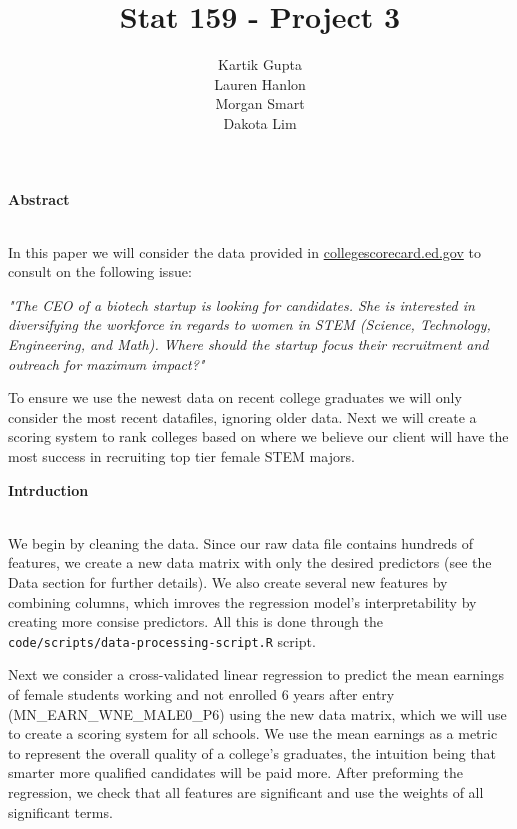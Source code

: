 \documentclass[11pt,english]{article}
\begin{document}


\title{\Large Stat 159 - Project 3}

\author{
\small Kartik Gupta\\
\small Lauren Hanlon\\
\small Morgan Smart\\
\small Dakota Lim\\
}
 
\maketitle


{\large\textbf{Abstract}} \\\

In this paper we will consider the data provided in \href{https://collegescorecard.ed.gov/data}{collegescorecard.ed.gov} to consult on the following issue:
\begin{center}
\emph{
"The CEO of a biotech startup is looking for candidates. She is interested in diversifying the workforce in regards to women in STEM (Science, Technology, Engineering, and Math). Where should the startup focus their recruitment and outreach for maximum impact?"
}
\end{center}
To ensure we use the newest data on recent college graduates we will only consider the most recent datafiles, ignoring older data. Next we will create a scoring system to rank colleges based on where we believe our client will have the most success in recruiting top tier female STEM majors.



\vspace*{3\baselineskip}

{\large\textbf{Intrduction}} \\\

We begin by cleaning the data. Since our raw data file contains hundreds of features, we create a new data matrix with only the desired predictors (see the Data section for further details). We also create several new features by combining columns, which imroves the regression model's interpretability by creating more consise predictors. All this is done through the 
\texttt{code/scripts/data-processing-script.R} script.

Next we consider a cross-validated linear regression to predict the mean earnings of female students working and not enrolled 6 years after entry \\
(MN\_EARN\_WNE\_MALE0\_P6) using the new data matrix, which we will use to create a scoring system for all schools. We use the mean earnings as a metric to represent the overall quality of a college's graduates, the intuition being that smarter more qualified candidates will be paid more. After preforming the regression, we check that all features are significant and use the weights of all significant terms.
\end{document}
